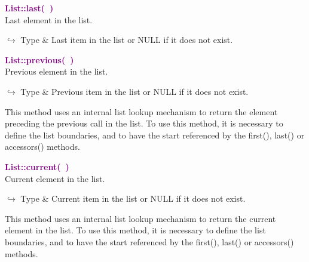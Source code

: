 
\textcolor{purple}{\textbf{List::last(~)}}\label{List::last()}\\
Last element in the list.\vspace*{-0.5em}
\begin{tcolorbox}[grow to left by=-1cm, width=\textwidth-1cm,myArgs,tabularx={l|R}]
$\hookrightarrow$ Type & Last item in the list or NULL if it does not exist.
\end{tcolorbox}


\textcolor{purple}{\textbf{List::previous(~)}}\label{List::previous()}\\
Previous element in the list.\vspace*{-0.5em}
\begin{tcolorbox}[grow to left by=-1cm, width=\textwidth-1cm,myArgs,tabularx={l|R}]
$\hookrightarrow$ Type & Previous item in the list or NULL if it does not exist.
\end{tcolorbox}

This method uses an internal list lookup mechanism to return the element preceding the previous call in the list.
To use this method, it is necessary to define the list boundaries, and to have the start referenced by the first(), last() or accessors() methods.

\textcolor{purple}{\textbf{List::current(~)}}\label{List::current()}\\
Current element in the list.\vspace*{-0.5em}
\begin{tcolorbox}[grow to left by=-1cm, width=\textwidth-1cm,myArgs,tabularx={l|R}]
$\hookrightarrow$ Type & Current item in the list or NULL if it does not exist.
\end{tcolorbox}

This method uses an internal list lookup mechanism to return the current element in the list.
To use this method, it is necessary to define the list boundaries, and to have the start referenced by the first(), last() or accessors() methods.

